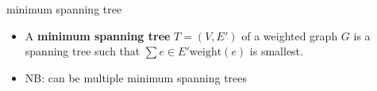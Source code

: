 \begin{frame}{minimum spanning tree}
    \begin{itemize}
        \item A \textbf{minimum spanning tree} $T=(V, E')$ of a weighted graph $G$ is a spanning tree such that $\sum e\in E' \text{weight}(e)$ is smallest.
        \item NB: can be multiple minimum spanning trees
    \end{itemize}
\end{frame}
